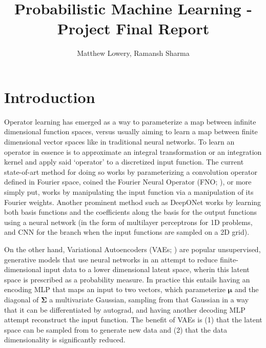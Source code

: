 \documentclass[11pt, fullpage,letterpaper]{article}
\title{Probabilistic Machine Learning - Project Final Report}
\author{Matthew Lowery, Ramansh Sharma}
\date{}
\begin{document}
\maketitle

\section{Introduction}

Operator learning has emerged as a way to parameterize a map between infinite dimensional function spaces, versus usually aiming to learn a map between finite dimensional vector spaces like in traditional neural networks. To learn an operator in essence is to approximate an integral transformation or an integration kernel and apply said `operator' to a discretized input function. The current state-of-art method for doing so works by parameterizing a convolution operator defined in Fourier space, coined the Fourier Neural Operator (FNO; \cite{li2021fourier}), or more simply put, works by manipulating the input function via a manipulation of its Fourier weights. Another prominent method such as DeepONet \cite{Lu_2021} works by learning both basis functions and the coefficients along the basis for the output functions using a neural network (in the form of multilayer perceptrons for 1D problems, and CNN for the branch when the input functions are sampled on a 2D grid).

On the other hand, Variational Autoencoders (VAEs; \cite{kingma2022autoencoding}) are popular unsupervised, generative models that use neural networks in an attempt to reduce finite-dimensional input data to a lower dimensional latent space, wherin this latent space is prescribed as a probability measure. In practice this entails having an encoding MLP that maps an input to two vectors, which parameterize $\mathbf{\mu}$ and the diagonal of $\mathbf{\Sigma}$ a multivariate Gaussian, sampling from that Gaussian in a way that it can be differentiated by autograd, and having another decoding MLP attempt reconstruct the input function. The benefit of VAEs is (1) that the latent space can be sampled from to generate new data and (2) that the data dimensionality is significantly reduced.
\end{document}
